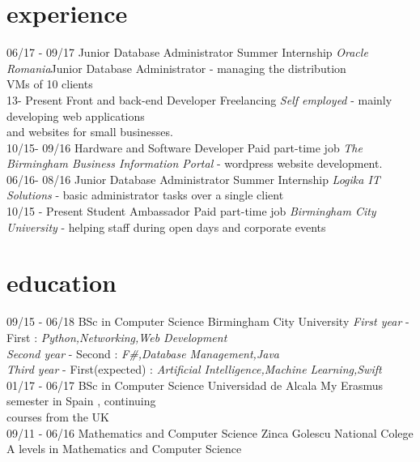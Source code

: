 \documentclass[]{friggeri-cv}
\begin{document}
\section{experience}
\begin{entrylist}
    \entry
  {06/17 - 09/17}
  {Junior Database Administrator}
  {Summer Internship}
  {\emph{Oracle Romania}{Junior Database Administrator} - managing the distribution \\VMs of 10 clients}\\
 
  \entry
  {13- Present}
  {Front and back-end Developer}
  {Freelancing}
  {\emph {Self employed} - mainly developing web applications \\and websites for small businesses.}
 \\
  \entry
  {10/15- 09/16}
  {Hardware and Software Developer}
  {Paid part-time job}
  {\emph{The Birmingham Business Information Portal} - wordpress website development.}
  \\
  \entry
  {06/16- 08/16}
  {Junior Database Administrator}
  {Summer Internship}
  {\emph{Logika IT Solutions} - basic administrator tasks over a single client}
  \\
  \entry
  {10/15 - Present}
  {Student Ambassador}
  {Paid part-time job}
  {\emph{Birmingham City University} - helping staff during open days and corporate events }
  
\end{entrylist}


\section{education}
\begin{entrylist}
  \entry
  {09/15 - 06/18}
  {BSc in Computer Science}
  {Birmingham City University}
  {
        \emph{First year }- First : \emph{Python,Networking,Web Development} \\
        \emph{Second year } - Second : \emph{F\#,Database Management,Java} \\ 
        \emph{Third year }- First(expected) : \emph{Artificial Intelligence,Machine Learning,Swift}
  }
  \\
  \entry
  {01/17 - 06/17}
  {BSc in Computer Science }
  {Universidad de Alcala}
  {My Erasmus semester in Spain , continuing \\courses from the UK
  }
  \\
  \entry
  {09/11 - 06/16}
  {Mathematics and Computer Science}
  {Zinca Golescu National Colege}
  {A levels in Mathematics and Computer Science}

  \end{entrylist}
  
\end{document}

